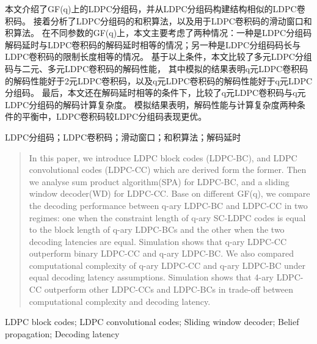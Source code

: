 

\begin{zhaiyao}
本文介绍了GF(q)上的LDPC分组码，并从LDPC分组码构建结构相似的LDPC卷积码。
接着分析了LDPC分组码的和积算法，以及用于LDPC卷积码的滑动窗口和积算法。
在不同参数的GF(q)上，本文主要考虑了两种情况：一种是LDPC分组码解码延时与LDPC卷积码的解码延时相等的情况；另一种是LDPC分组码码长与LDPC卷积码的限制长度相等的情况。
基于以上条件，本文比较了多元LDPC分组码与二元、多元LDPC卷积码的解码性能，
其中模拟的结果表明q元LDPC卷积码的解码性能好于2元LDPC卷积码，以及q元LDPC卷积码的解码性能好于q元LDPC分组码。
最后，本文还在解码延时相等的条件下，比较了q元LDPC卷积码与q元LDPC分组码的解码计算复杂度。
模拟结果表明，解码性能与计算复杂度两种条件的平衡中，LDPC卷积码较LDPC分组码表现更优。
\newline

\end{zhaiyao}


\begin{guanjianci}
LDPC分组码；LDPC卷积码；滑动窗口；和积算法；解码延时
\end{guanjianci}



\begin{abstract}
In this paper, we introduce LDPC block codes (LDPC-BC), and LDPC convolutional codes (LDPC-CC) which are derived form the former. Then we analyse sum product algorithm(SPA) for LDPC-BC, and a sliding window decoder(WD) for LDPC-CC. Base on different GF(q), we compare the decoding performance between q-ary LDPC-BC and LDPC-CC in two regimes: one when the constraint length of q-ary SC-LDPC codes is equal to the block length of q-ary LDPC-BCs and the other when the two decoding latencies are equal. Simulation shows that q-ary LDPC-CC outperform binary LDPC-CC and q-ary LDPC-BC.
We also compared computational complexity of q-ary LDPC-CC and q-ary LDPC-BC under equal decoding latency assumptions.
Simulation shows that 4-ary LDPC-CC outperform other LDPC-CCs and LDPC-BCs in trade-off between computational complexity and decoding latency.
\newline

\end{abstract}


\begin{keywords}
LDPC block codes; LDPC convolutional codes; Sliding window decoder; Belief propagation; Decoding latency
\end{keywords} 